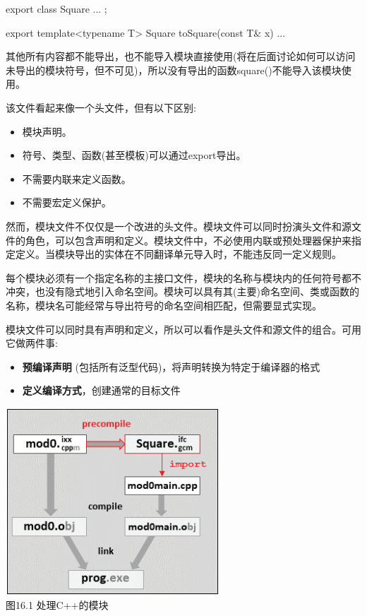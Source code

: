 \begin{cpp}
export class Square {
	...
};

export template<typename T>
Square toSquare(const T& x) {
	...
}
\end{cpp}

其他所有内容都不能导出，也不能导入模块直接使用(将在后面讨论如何可以访问未导出的模块符号，但不可见)，所以没有导出的函数square()不能导入该模块使用。

该文件看起来像一个头文件，但有以下区别:

\begin{itemize}
\item
模块声明。

\item
符号、类型、函数(甚至模板)可以通过export导出。

\item
不需要内联来定义函数。

\item
不需要宏定义保护。
\end{itemize}

然而，模块文件不仅仅是一个改进的头文件。模块文件可以同时扮演头文件和源文件的角色，可以包含声明和定义。模块文件中，不必使用内联或预处理器保护来指定定义。当模块导出的实体在不同翻译单元导入时，不能违反同一定义规则。

每个模块必须有一个指定名称的主接口文件，模块的名称与模块内的任何符号都不冲突，也没有隐式地引入命名空间。模块可以具有其(主要)命名空间、类或函数的名称，模块名可能经常与导出符号的命名空间相匹配，但需要显式实现。


模块文件可以同时具有声明和定义，所以可以看作是头文件和源文件的组合。可用它做两件事:

\begin{itemize}
\item
\textbf{预编译声明} (包括所有泛型代码)，将声明转换为特定于编译器的格式

\item
\textbf{定义编译方式}，创建通常的目标文件
\end{itemize}

\begin{center}
\includegraphics[width=0.6\textwidth]{content/chapter16/images/1.png}\\
图16.1 处理C++的模块
\end{center}

